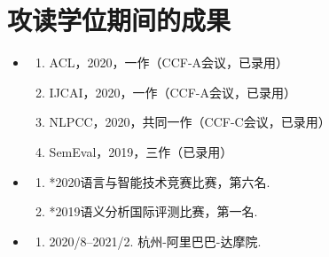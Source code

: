 \chapter{攻读学位期间的成果}

\begin{itemize}
	\setlength{\itemsep}{5pt}
	
	\item \textbf{\heiti{}}
	      \begin{enumerate}
	      	\setlength{\itemsep}{-\itemsep}  %
	      	
	      	\item ACL，2020，一作（CCF-A会议，已录用）
	      	\item IJCAI，2020，一作（CCF-A会议，已录用）
	      	\item NLPCC，2020，共同一作（CCF-C会议，已录用）
	      	\item SemEval，2019，三作（已录用）
	      	      
	      \end{enumerate}
	      
	\item \textbf{\heiti{}}
	      \begin{enumerate}
	      	\item *2020语言与智能技术竞赛比赛，第六名.
	      	\item *2019语义分析国际评测比赛，第一名.
	      \end{enumerate}
	      
	\item \textbf{\heiti{}}
	      \begin{enumerate}
	      	\item \textsc{2020/8--2021/2}. 杭州-阿里巴巴-达摩院.
	      \end{enumerate}
	      
\end{itemize}
